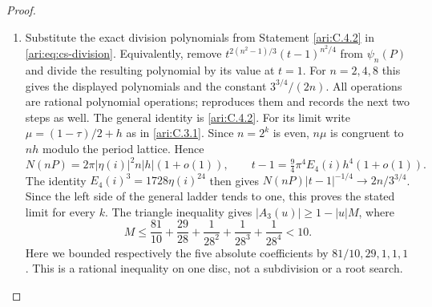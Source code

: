 \begin{proof}
\begin{enumerate}[label=\arabic*.,leftmargin=*]
\item Substitute the exact division polynomials from Statement \ref{ari:C.4.2}
in \eqref{ari:eq:cs-division}. Equivalently, remove
$t^{2(n^2-1)/3}(t-1)^{n^2/4}$ from $\psi_n(P)$ and divide
the resulting polynomial by its value at $t=1$. For $n=2,4,8$
this gives the displayed polynomials and the constant
$3^{3/4}/(2n)$. All operations are rational polynomial operations;
 reproduces them and records
the next two steps as well. The general identity is \ref{ari:C.4.2}.
For its limit write $\mu=(1-\tau)/2+h$ as in \ref{ari:C.3.1}. Since
$n=2^k$ is even, $n\mu$ is congruent to $nh$ modulo the
period lattice. Hence
\[
 N(nP)=2\pi|\eta(i)|^2 n|h|(1+o(1)),\qquad
 t-1=\tfrac94\pi^4E_4(i)h^4(1+o(1)).
\]
The identity $E_4(i)^3=1728\eta(i)^{24}$ then gives
$N(nP)|t-1|^{-1/4}\to2n/3^{3/4}$.
Since the left side of the general ladder tends to one,
this proves the stated limit for every $k$.
The triangle inequality gives
$|A_3(u)|\ge1-|u|M$, where
\[
 M\le\frac{81}{10}+\frac{29}{28}
                +\frac1{28^2}+\frac1{28^3}+\frac1{28^4}<10.
\]
Here we bounded respectively the five absolute coefficients by
$81/10,29,1,1,1$. This is a rational inequality on one disc,
not a subdivision or a root search.
\end{enumerate}
\end{proof}

